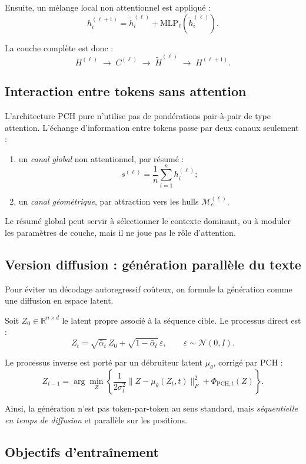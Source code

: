 \documentclass[11pt]{article}
\begin{document}
Ensuite, un mélange local non attentionnel est appliqué :
\[
h_i^{(\ell+1)}
=
\tilde h_i^{(\ell)}
+
\mathrm{MLP}_\ell\!\left(\tilde h_i^{(\ell)}\right).
\]

La couche complète est donc :
\[
H^{(\ell)} \;\to\; C^{(\ell)} \;\to\; \tilde H^{(\ell)} \;\to\; H^{(\ell+1)}.
\]

\subsection{Interaction entre tokens sans attention}

L'architecture PCH pure n'utilise pas de pondérations pair-à-pair de type attention.  
L'échange d'information entre tokens passe par deux canaux seulement :

\begin{enumerate}[leftmargin=2em]
    \item un \emph{canal global} non attentionnel, par résumé :
    \[
    s^{(\ell)} = \frac1n\sum_{i=1}^n h_i^{(\ell)};
    \]
    \item un \emph{canal géométrique}, par attraction vers les hulls \(\mathcal M_c^{(\ell)}\).
\end{enumerate}

Le résumé global peut servir à sélectionner le contexte dominant, ou à moduler les paramètres de couche, mais il ne joue pas le rôle d'attention.

\subsection{Version diffusion : génération parallèle du texte}

Pour éviter un décodage autoregressif coûteux, on formule la génération comme une diffusion en espace latent.

Soit \(Z_0\in\mathbb R^{n\times d}\) le latent propre associé à la séquence cible.
Le processus direct est :
\[
Z_t
=
\sqrt{\bar\alpha_t}\,Z_0
+
\sqrt{1-\bar\alpha_t}\,\varepsilon,
\qquad
\varepsilon\sim\mathcal N(0,I).
\]

Le processus inverse est porté par un débruiteur latent \(\mu_\theta\), corrigé par PCH :
\[
Z_{t-1}
=
\arg\min_Z
\left\{
\frac1{2\sigma_t^2}\|Z-\mu_\theta(Z_t,t)\|_F^2
+
\Phi_{\mathrm{PCH},t}(Z)
\right\}.
\]

Ainsi, la génération n'est pas token-par-token au sens standard, mais \emph{séquentielle en temps de diffusion} et parallèle sur les positions.

\subsection{Objectifs d'entraînement}
\end{document}
